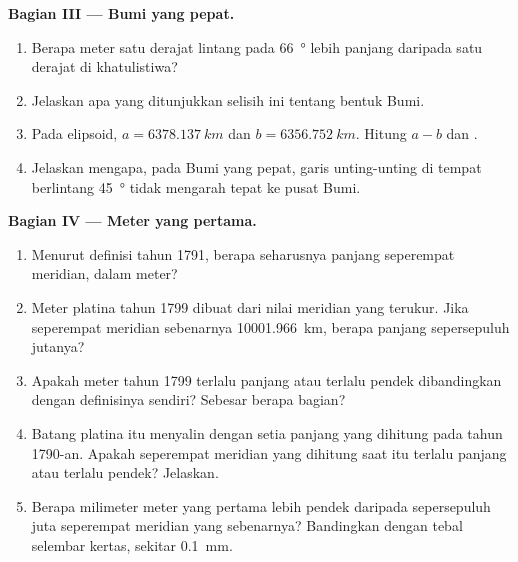 \begin{problem}
\medskip
\noindent\textbf{Bagian III --- Bumi yang pepat.}
\begin{enumerate}[resume]
  \item Berapa meter satu derajat lintang pada \qty{66}{\degree} lebih
        panjang daripada satu derajat di khatulistiwa?
  \item Jelaskan apa yang ditunjukkan selisih ini tentang bentuk Bumi.
  \item Pada elipsoid, $a = \qty{6378.137}{km}$ dan
        $b = \qty{6356.752}{km}$. Hitung $a - b$ dan .
  \item Jelaskan mengapa, pada Bumi yang pepat, garis unting-unting di tempat
        berlintang \qty{45}{\degree} tidak mengarah tepat ke pusat
        Bumi.
\end{enumerate}

\medskip
\noindent\textbf{Bagian IV --- Meter yang pertama.}
\begin{enumerate}[resume]
  \item Menurut definisi tahun 1791, berapa seharusnya panjang seperempat
        meridian, dalam meter?
  \item Meter platina tahun 1799 dibuat dari nilai meridian yang terukur.
        Jika seperempat meridian sebenarnya \qty{10001.966}{km}, berapa
        panjang sepersepuluh jutanya?
  \item Apakah meter tahun 1799 terlalu panjang atau terlalu pendek
        dibandingkan dengan definisinya sendiri? Sebesar berapa bagian?
  \item Batang platina itu menyalin dengan setia panjang yang dihitung pada
        tahun 1790-an. Apakah seperempat meridian yang dihitung saat itu
        terlalu panjang atau terlalu pendek? Jelaskan.
  \item Berapa milimeter meter yang pertama lebih pendek daripada
        sepersepuluh juta seperempat meridian yang sebenarnya? Bandingkan
        dengan tebal selembar kertas, sekitar \qty{0.1}{mm}.
\end{enumerate}
\end{problem}
